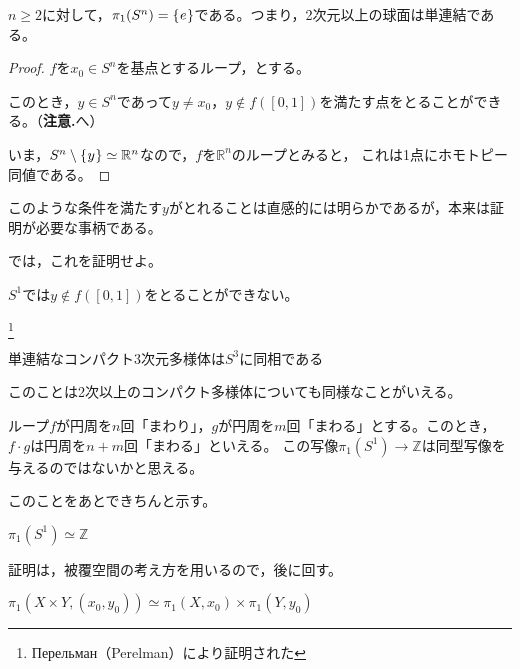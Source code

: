 \documentclass[uplatex]{jsarticle}
\begin{document}
\sukima {}

\begin{teiri}
  $n \ge 2$に対して，$\pi_{1}(S^{n}) = \Set{\hspace{-1.8pt} e \hspace{-1.8pt}}$である。つまり，2次元以上の球面は単連結である。
\end{teiri}

\begin{proof}
  $f$を$x_{0} \in S^{n}$を基点とするループ，とする。

  このとき，$y \in S^{n}$であって$y \neq x_{0}$，$y \notin f([0,1])$を満たす点をとることができる。（{\bf 注意.}へ）

  いま，$S^{n} \setminus \Set{\hspace{-1.8pt} y \hspace{-1.8pt}} \simeq \mathbb{R}^{n}$なので，$f$を$\mathbb{R}^{n}$のループとみると，
  これは1点にホモトピー同値である。
\end{proof}

 このような条件を満たす$y$がとれることは直感的には明らかであるが，本来は証明が必要な事柄である。

 では，これを証明せよ。

\sukima {} $S^{1}$では$y \notin f([0,1])$をとることができない。

\sukima {}\footnote{Перельман（Perelman）により証明された}
\begin{teiri}
  単連結なコンパクト3次元多様体は$S^{3}$に同相である
\end{teiri}

このことは2次以上のコンパクト多様体についても同様なことがいえる。

\sukima {}

ループ$f$が円周を$n$回「まわり」，$g$が円周を$m$回「まわる」とする。このとき，$f \cdot g$は円周を$n + m$回「まわる」といえる。
この写像$\pi_{1}(S^{1}) \longrightarrow \mathbb{Z}$は同型写像を与えるのではないかと思える。

このことをあとできちんと示す。

\begin{teiri}
  $\pi_{1}(S^{1}) \simeq \mathbb{Z}$
\end{teiri}

証明は，被覆空間の考え方を用いるので，後に回す。

\sukima {}

\begin{teiri}
  $\pi_{1} (X \times Y, (x_{0}, y_{0})) \simeq \pi_{1}(X, x_{0}) \times \pi_{1}(Y, y_{0})$
\end{teiri}
\end{document}
